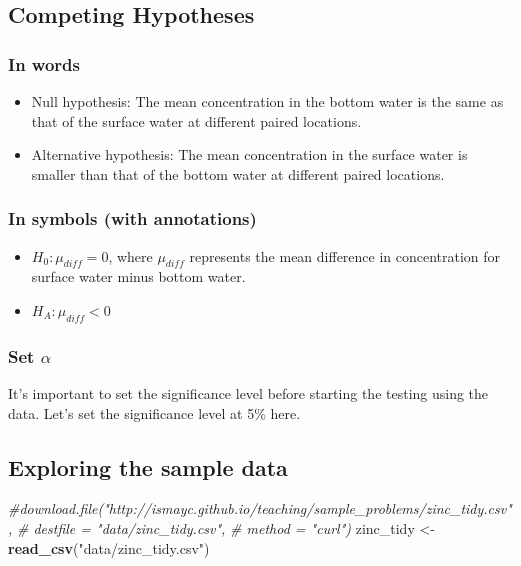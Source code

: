 \documentclass[]{tufte-book}
\newenvironment{Shaded}{\begin{snugshade}}{\end{snugshade}}
\newcommand{\KeywordTok}[1]{\textcolor[rgb]{0.13,0.29,0.53}{\textbf{{#1}}}}
\newcommand{\StringTok}[1]{\textcolor[rgb]{0.31,0.60,0.02}{{#1}}}
\newcommand{\CommentTok}[1]{\textcolor[rgb]{0.56,0.35,0.01}{\textit{{#1}}}}
\newcommand{\NormalTok}[1]{{#1}}
\providecommand{\tightlist}{%
  \setlength{\itemsep}{0pt}\setlength{\parskip}{0pt}}
\theoremstyle{definition}
\theoremstyle{definition}
\theoremstyle{remark}
\begin{document}
\subsection{Competing Hypotheses}\label{competing-hypotheses-4}

\subsubsection{In words}\label{in-words-4}

\begin{itemize}
\item
  Null hypothesis: The mean concentration in the bottom water is the
  same as that of the surface water at different paired locations.
\item
  Alternative hypothesis: The mean concentration in the surface water is
  smaller than that of the bottom water at different paired locations.
\end{itemize}

\subsubsection{In symbols (with
annotations)}\label{in-symbols-with-annotations-4}

\begin{itemize}
\tightlist
\item
  \(H_0: \mu_{diff} = 0\), where \(\mu_{diff}\) represents the mean
  difference in concentration for surface water minus bottom water.
\item
  \(H_A: \mu_{diff} < 0\)
\end{itemize}

\subsubsection{\texorpdfstring{Set
\(\alpha\)}{Set \textbackslash{}alpha}}\label{set-alpha-4}

It's important to set the significance level before starting the testing
using the data. Let's set the significance level at 5\% here.

\subsection{Exploring the sample
data}\label{exploring-the-sample-data-4}

\begin{Shaded}
\begin{Highlighting}[]
\CommentTok{#download.file("http://ismayc.github.io/teaching/sample_problems/zinc_tidy.csv",}
\CommentTok{#              destfile = "data/zinc_tidy.csv",}
\CommentTok{#              method = "curl")}
\NormalTok{zinc_tidy <-}\StringTok{ }\KeywordTok{read_csv}\NormalTok{(}\StringTok{"data/zinc_tidy.csv"}\NormalTok{)}
\end{Highlighting}
\end{Shaded}
\end{document}

